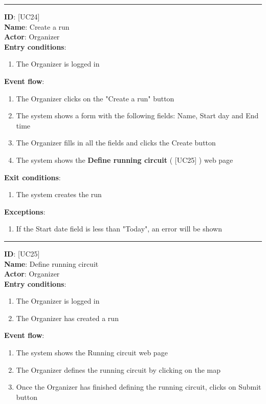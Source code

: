 \documentclass[12pt]{report}
\newcommand\usecase[1]{ [UC#1] }
\begin{document}
\begin{itemize}
  	\rule{\linewidth}{0.4pt}
  	\textbf{ID}: \usecase{24} \\
  	\textbf{Name}: Create a run \\
    \textbf{Actor}: Organizer \\
    \textbf{Entry conditions}: 
    		\begin{enumerate}
    			\item{The Organizer is logged in}
    		\end{enumerate}
  	\textbf{Event flow}:
  		\begin{enumerate}
    			\item{The Organizer clicks on the "Create a run" button}
    			\item{The system shows a form with the following fields: Name, Start day and End time}
    			\item{The Organizer fills in all the fields and clicks the Create button}
    			\item{The system shows the \textbf{Define running circuit} (\usecase{25}) web page}
  		\end{enumerate}
  	\textbf{Exit conditions}:
  		\begin{enumerate}
    			\item{The system creates the run}
  		\end{enumerate}
  	\textbf{Exceptions}:
  		\begin{enumerate}
  			\item{If the Start date field is less than "Today", an error will be shown}
  		\end{enumerate}
  	\rule{\linewidth}{0.4pt}
  	\textbf{ID}: \usecase{25} \\
  	\textbf{Name}: Define running circuit \\
    \textbf{Actor}: Organizer \\
    \textbf{Entry conditions}: 
    		\begin{enumerate}
    			\item{The Organizer is logged in}
    			\item{The Organizer has created a run}
    		\end{enumerate}
  	\textbf{Event flow}:
  		\begin{enumerate}
    			\item{The system shows the Running circuit web page}
    			\item{The Organizer defines the running circuit by clicking on the map}
    			\item{Once the Organizer has finished defining the running circuit, clicks on Submit button}

\end{enumerate}
\end{itemize}
\end{document}
